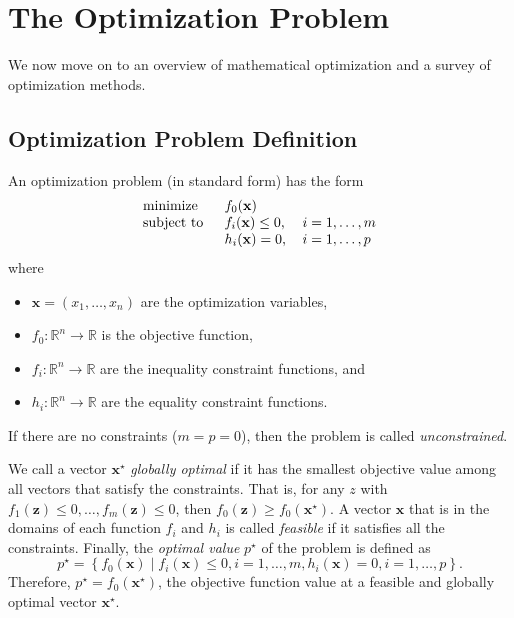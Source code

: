 \section{The Optimization Problem}
We now move on to an overview of mathematical optimization and a survey of optimization methods.
\subsection{Optimization Problem Definition}
\begin{defn}
	An optimization problem (in standard form) has the form
	\begin{equation}
		\begin{tabular}{lll}
			\text{minimize }   & $f_0(\mathbf{x})$        &                 \\
			\text{subject to } & $f_i(\mathbf{x})\leq 0$, & $i=1,\ldots, m$ \\
			& $h_i(\mathbf{x}) = 0$,   & $i=1,\ldots, p$ 
		\end{tabular}\label{Optimization}
	\end{equation}
	where
	\begin{itemize}
		\item $\mathbf{x}=\left(x_1,\ldots,x_n\right)$ are the optimization variables,
		\item $f_0 : \mathbb{R}^n\rightarrow\mathbb{R}$ is the objective function,
		\item $f_i : \mathbb{R}^n\rightarrow\mathbb{R}$ are the inequality constraint functions, and
		\item $h_i : \mathbb{R}^n\rightarrow\mathbb{R}$ are the equality constraint functions.
	\end{itemize}
\end{defn}
If there are no constraints ($m=p=0$), then the problem is called \textit{unconstrained}. \cite[p. 127]{Boyd2004}

We call a vector $\mathbf{x}^\star$ \textit{globally optimal} if it has the smallest objective value among all vectors that satisfy the constraints. That is, for any $z$ with $f_1(\mathbf{z})\leq 0,\ldots, f_m(\mathbf{z})\leq 0$, then $f_0(\mathbf{z})\geq f_0(\mathbf{x}^\star)$. A vector $\mathbf{x}$ that is in the domains of each function $f_i$ and $h_i$ is called \textit{feasible} if it satisfies all the constraints. Finally, the \textit{optimal value} $p^\star$ of the problem is defined as $$p^\star=\left\lbrace f_0(\mathbf{x}) \mid f_i(\mathbf{x})\leq 0, i=1,\ldots,m, h_i(\mathbf{x})=0, i=1,\ldots,p\right\rbrace.$$ Therefore, $p^{\star}=f_0(\mathbf{x}^\star)$, the objective function value at a feasible and globally optimal vector $\mathbf{x}^{\star}$.

